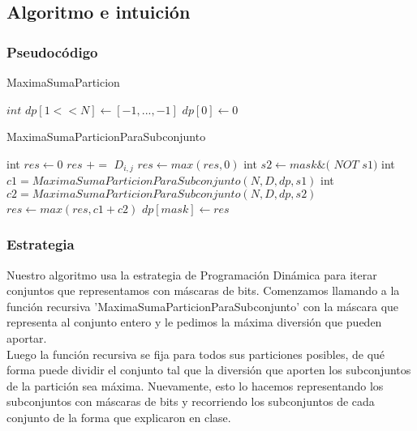\subsection{Algoritmo e intuición}

\subsubsection*{Pseudocódigo}

\begin{algorithm}[H]
    \caption{MaximaSumaParticion}
    $int$  $\mathit{dp[1<<N]} \gets [-1,...,-1]$ \;
    $\mathit{dp[0]} \gets 0$ \;
\end{algorithm}

\begin{algorithm}[H]
    \caption{MaximaSumaParticionParaSubconjunto}
     {
    }{
    int $\mathit{res} \gets 0$ \;
     {
         {
             {
                $res$ $+=$ $D_{i,j}$
            }
        }
    }
    $res \gets max(res, 0)$ \;
     {
        int $s2 \gets mask \& ($ $NOT$ $ s1)$ \;
        int $c1 = MaximaSumaParticionParaSubconjunto(N, D, dp, s1)$ \;
        int $c2 = MaximaSumaParticionParaSubconjunto(N, D, dp, s2)$ \;
        $res \gets max(res, c1+c2)$ \;
    }
    $dp[mask] \gets res$ \;
    }
\end{algorithm}
\bigskip

\subsubsection*{Estrategia}

Nuestro algoritmo usa la estrategia de Programación Dinámica para iterar conjuntos que representamos con máscaras de bits. Comenzamos llamando a la función recursiva 'MaximaSumaParticionParaSubconjunto' con la máscara que representa al conjunto entero y le pedimos la máxima diversión que pueden aportar. \\
Luego la función recursiva se fija para todos sus particiones posibles, de qué forma puede dividir el conjunto tal que la diversión que aporten los subconjuntos de la partición sea máxima. Nuevamente, esto lo hacemos representando los subconjuntos con máscaras de bits y recorriendo los subconjuntos de cada conjunto de la forma que explicaron en clase.

